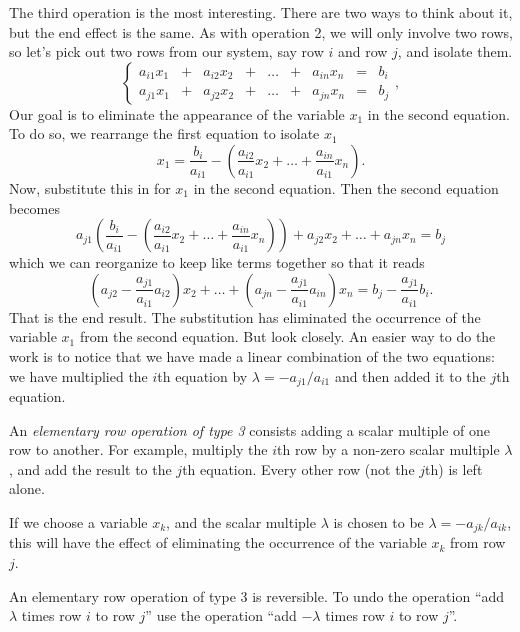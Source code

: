 \documentclass[elementsmain.tex]{subfiles}
\begin{document}
The third operation is the most interesting. There are two ways to think about it, but the end effect is the same. As with operation 2, we will only involve two rows, so let's pick out two rows from our system, say row $i$ and row $j$, and isolate them.
\begin{equation}
\left\{
\begin{array}{ccccccccc}
a_{i1} x_1 & + & a_{i2} x_2 & + & \dots & + & a_{in} x_n & = & b_i \\
a_{j1} x_1 & + & a_{j2} x_2 & + & \dots & + & a_{jn} x_n & = & b_j 
\end{array}\right.,
\end{equation}
Our goal is to eliminate the appearance of the variable $x_1$ in the second equation. To do so, we rearrange the first equation to isolate $x_1$
\[
x_1 = \dfrac{b_i}{a_{i1}} - \left( \dfrac{a_{i2}}{a_{i1}} x_2 + \dots + \dfrac{a_{in}}{a_{i1}} x_n \right).
\]
Now, substitute this in for $x_1$ in the second equation. Then the second equation becomes
\[
a_{j1}\left( \dfrac{b_i}{a_{i1}} - \left( \dfrac{a_{i2}}{a_{i1}} x_2 + \dots + \dfrac{a_{in}}{a_{i1}} x_n \right) \right) + a_{j2} x_2  + \dots + a_{jn} x_n = b_j 
\]
which we can reorganize to keep like terms together so that it reads
\[
 \left(a_{j2}-\dfrac{a_{j1}}{a_{i1}}a_{i2}\right) x_2  + \dots + \left(a_{jn}-\dfrac{a_{j1}}{a_{i1}}a_{in}\right) x_n = b_j - \dfrac{a_{j1}}{a_{i1}} b_i .
\]
That is the end result. The substitution has eliminated the occurrence of the variable $x_1$ from the second equation. But look closely. An easier way to do the work is to notice that we have made a linear combination of the two equations: we have multiplied the $i$th equation by $\lambda = -a_{j1}/a_{i1}$ and then added it to the $j$th equation.


\begin{definition}
An \emph{elementary row operation of type 3} consists adding a scalar multiple of one row to another. For example, multiply the $i$th row by a non-zero scalar multiple $\lambda$, and add the result to the $j$th equation. Every other row (not the $j$th) is left alone.

If we choose a variable $x_k$, and the scalar multiple $\lambda$ is chosen to be $\lambda = -a_{jk}/a_{ik}$, this will have the effect of eliminating the occurrence of the variable $x_k$ from row $j$.
\end{definition}

\begin{remark}
An elementary row operation of type 3 is reversible. To undo the operation ``add $\lambda$ times row $i$ to row $j$'' use the operation ``add $-\lambda$ times row $i$ to row $j$''.
\end{remark}
\end{document}
